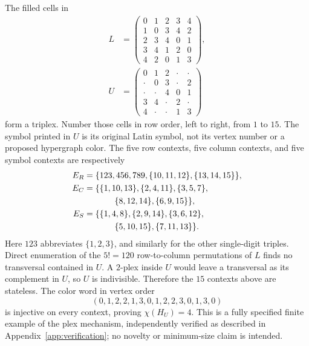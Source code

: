 \documentclass[aps,pra,reprint,superscriptaddress,longbibliography,nofootinbib,floatfix,10pt]{revtex4-2}
\theoremstyle{definition}\newtheorem{definition}[theorem]{Definition}
\theoremstyle{remark}\newtheorem{remark}[theorem]{Remark}
\begin{document}
The filled cells in
\begin{equation}\label{eq:triplex-square}
\begin{aligned}
L&=\begin{pmatrix}0&1&2&3&4\\1&0&3&4&2\\2&3&4&0&1\\3&4&1&2&0\\4&2&0&1&3\end{pmatrix},\\
U&=\begin{pmatrix}0&1&2&\cdot&\cdot\\\cdot&0&3&\cdot&2\\\cdot&\cdot&4&0&1\\3&4&\cdot&2&\cdot\\4&\cdot&\cdot&1&3\end{pmatrix}
\end{aligned}
\end{equation}
form a triplex. Number those cells in row order, left to right, from $1$ to $15$. The symbol printed in $U$ is its original Latin symbol, not its vertex number or a proposed hypergraph color. The five row contexts, five column contexts, and five symbol contexts are respectively
\begin{equation}\label{eq:triplex-full-contexts}
\begin{aligned}
E_R={}&\{123,456,789,\{10,11,12\},\{13,14,15\}\},\\
E_C={}&\{\{1,10,13\},\{2,4,11\},\{3,5,7\},\\
&\hspace{8mm}\{8,12,14\},\{6,9,15\}\},\\
E_S={}&\{\{1,4,8\},\{2,9,14\},\{3,6,12\},\\
&\hspace{8mm}\{5,10,15\},\{7,11,13\}\}.
\end{aligned}
\end{equation}
Here $123$ abbreviates $\{1,2,3\}$, and similarly for the other single-digit triples. Direct enumeration of the $5!=120$ row-to-column permutations of $L$ finds no transversal contained in $U$. A $2$-plex inside $U$ would leave a transversal as its complement in $U$, so $U$ is indivisible. Therefore the $15$ contexts above are stateless. The color word in vertex order
\begin{equation}\label{eq:triplex-four-colors}
(0,1,2,2,1,3,0,1,2,2,3,0,1,3,0)
\end{equation}
is injective on every context, proving $\chi(H_U)=4$. This is a fully specified finite example of the plex mechanism, independently verified as described in Appendix~\ref{app:verification}; no novelty or minimum-size claim is intended.
\end{document}
